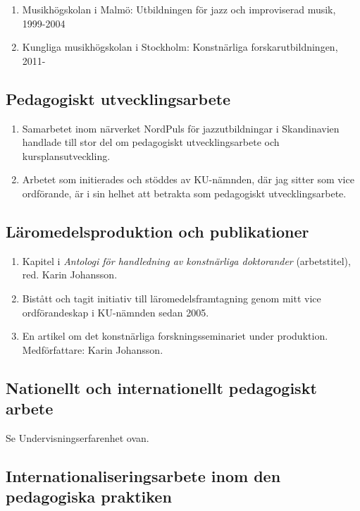 \begin{enumerate}
\item Musikhögskolan i Malmö: Utbildningen för jazz och improviserad musik, 1999-2004
\item Kungliga musikhögskolan i Stockholm: Konstnärliga forskarutbildningen, 2011-
\end{enumerate}

\subsection*{\textsf{Pedagogiskt utvecklingsarbete}}

\begin{enumerate}
\item Samarbetet inom närverket NordPuls för jazzutbildningar i
  Skandinavien handlade till stor del om pedagogiskt utvecklingsarbete
  och kursplansutveckling.
\item Arbetet som initierades och stöddes av KU-nämnden, där jag sitter som vice ordförande, är i sin helhet att betrakta som pedagogiskt utvecklingsarbete.
\end{enumerate}


\subsection*{\textsf{Läromedelsproduktion och publikationer}}

\begin{enumerate}
\item Kapitel i \emph{Antologi för handledning av konstnärliga doktorander} (arbetstitel), red. Karin Johansson.
\item Bistått och tagit initiativ till läromedelsframtagning genom mitt vice ordförandeskap i KU-nämnden sedan 2005.
\item En artikel om det konstnärliga forskningsseminariet under produktion. Medförfattare: Karin Johansson.
\end{enumerate}

\subsection*{\textsf{Nationellt och internationellt pedagogiskt arbete}}

Se Undervisningserfarenhet ovan.

\subsection*{\textsf{Internationaliseringsarbete inom den pedagogiska praktiken}}

